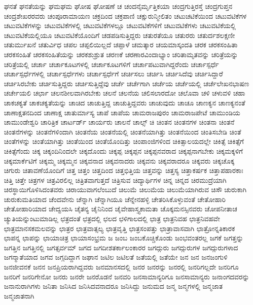 {ಘನತೆ
ಘನತೆಯನ್ನು
ಘಮಘಮ
ಘೋಷ
ಘೋಷಣೆ
ಚ
ಚಂದನೈರ್ಮೃತ್ತಿಕಯಾ
ಚಂದ್ರಗುತ್ತಿರಸ್ತೆ
ಚಂದ್ರಗುಪ್ತನ
ಚಂದ್ರಶೇಖರರವರು
ಚಂಪೂರಾಮಾಯಣ
ಚಕ್ರದಿಂದ
ಚಕ್ರಪಾಣಿ
ಚಕ್ಷುರುನ್ಮೀಲಿತಂ
ಚಟುಚಟಿಕೆಯಿಂದ
ಚಟುವಟಿಕೆಗಳ
ಚಟುವಟಿಕೆಗಳನ್ನು
ಚಟುವಟಿಕೆಗಳಲ್ಲಿ
ಚಟುವಟಿಕೆಗಳಲ್ಲೂ
ಚಟುವಟಿಕೆಗಳಿಗೆ
ಚಟುವಟಿಕೆಗಳು
ಚಟುವಟಿಕೆಯಲ್ಲಿ
ಚಟುವಟಿಕೆಯಲ್ಲಿಯೂ
ಚಟುವಟಿಕೆಯೊಂದಿಗೆ
ಚಡಪಡಿಸುತ್ತಿದ್ದರು
ಚತುರತೆಯೂ
ಚತುರರು
ಚತುರ್ದಶಲಕ್ಷಣೀ
ಚತುರ್ಮುಖನೆ
ಚತುರ್ವಿಧ
ಚಪಲ
ಚಪ್ಪಲಿಯಿಲ್ಲದೆ
ಚಪ್ಪಾಳೆ
ಚಮತ್ಕಾರ
ಚಯಮಾಸ್ಕಂದತಿ
ಚರಕ
ಚರಕಸಂಹಿತಾ
ಚರಕಸಂಹಿತೆ
ಚರಕಸಂಹಿತೆಯನ್ನು
ಚರಕಶುಶ್ರುತ
ಚರಣಕೆ
ಚರಣಾರವಿಂದಾಭ್ಯಾಂ
ಚರಿತಾಮೃತವನ್ನು
ಚರಿತ್ರೆಯನ್ನು
ಚರಿತ್ರೆಯಲ್ಲಿ
ಚರ್ಚಾ
ಚರ್ಚಾಕೂಟಗಳಲ್ಲಿ
ಚರ್ಚಾಕೂಟಗಳಿಗೆ
ಚರ್ಚಾಪಟುವಾಗಿದ್ದರೆಂದು
ಚರ್ಚಾಸ್ಪರ್ಧೆ
ಚರ್ಚಾಸ್ಪರ್ಧೆಗಳಲ್ಲಿ
ಚರ್ಚಾಸ್ಪರ್ಧೆಗಳು
ಚರ್ಚಾಸ್ಪರ್ಧೆಗೆ
ಚರ್ಚಿಸಲು
ಚರ್ಚಿಸಿ
ಚರ್ಚಿಸಿದೆವು
ಚರ್ಚಿಸಿದ್ದಾರೆ
ಚರ್ಚಿಸಿರಬೇಕು
ಚರ್ಚಿಸುತ್ತಿದ್ದರು
ಚರ್ಚಿಸುತ್ತಿದ್ದೆವು
ಚರ್ಚೆ
ಚರ್ಚೆಗಾಗಿ
ಚರ್ಚೆಯ
ಚರ್ಚೆಯಲ್ಲಿ
ಚರ್ಚೆಲೇಖನಭಾಷಣ
ಚರ್ಚೇಯಲಿ
ಚರ್ಛಾ
ಚಲನಶೀಲವಾಗಿರಬೇಕು
ಚಲನೆ
ಚಲನೆಯ
ಚಲಿಸಲಾರದೋ
ಚಲೊವಾ
ಚಳಿ
ಚಳುವಳಿ
ಚಹಾ
ಚಾಕಚಕ್ಯತೆ
ಚಾಕಚಕ್ಯತೆಯನ್ನು
ಚಾಚಿದ
ಚಾಚುತ್ತಿದ್ದ
ಚಾಚುತ್ತಿದ್ದವರು
ಚಾಚುವುದು
ಚಾಚೂ
ಚಾಣಕ್ಯನ
ಚಾಣಕ್ಯನಂತೆ
ಚಾಣಾಕ್ಷತನದಿಂದ
ಚಾಣಾಕ್ಷ
ಚಾತುರ್ಮಾಸ್ಯ
ಚಾಪೆ
ಚಾಪೆಯ
ಚಾಮರಾಜಪುರಂ
ಚಾಮರಾಜಪೇಟೆ
ಚಾಮುಂಡಿಯ
ಚಾಮುಂಡೇಶ್ವರಿ
ಚಾರಿತ್ರಿಕ
ಚಾರ್ಟರ್ಡ್
ಚಾರ್ಯರು
ಚಾಲನೆ
ಚಾಲ್ಸ್
ಚಿ
ಚಿಂತನ
ಚಿಂತನಗಳ
ಚಿಂತನಾ
ಚಿಂತನೆ
ಚಿಂತನೆಗಳನ್ನು
ಚಿಂತನೆಗಳಿಂದಾಗಿ
ಚಿಂತನೆಯ
ಚಿಂತನೆಯಲ್ಲಿ
ಚಿಂತನೆಯಾಗಿತ್ತು
ಚಿಂತನೆಯಿಂದ
ಚಿಂತಿಸಬೇಡಿ
ಚಿಂತೆ
ಚಿಂತೆಗಳನ್ನು
ಚಿಂತೆಯಾಗಿತ್ತು
ಚಿಂತೆಯಿಂದ
ಚಿಂತೆಯೊಂದಿತ್ತು
ಚಿಂಪಾಂಜಿಗಳಿಂದ
ಚಿಕಿತ್ಸಾಲಯದಲ್ಲೇ
ಚಿಕಿತ್ಸೆ
ಚಿಕಿತ್ಸೆಗೆ
ಚಿಕಿತ್ಸೆಗೆಂದು
ಚಿಕ್ಕ
ಚಿಕ್ಕಂದಿನಿಂದಲೇ
ಚಿಕ್ಕದೊಂದು
ಚಿಕ್ಕಪ್ಪ
ಚಿಕ್ಕಪ್ಪನ
ಚಿಕ್ಕಪ್ಪನವರಾದ
ಚಿಕ್ಕಪ್ಪನಾಗಬೇಕು
ಚಿಕ್ಕಮಕ್ಕಳಿಗೆ
ಚಿಕ್ಕಮಾರ್ಕೆಟಿಗೆ
ಚಿಕ್ಕಮ್ಮ
ಚಿಕ್ಕಮ್ಮನ
ಚಿಕ್ಕವನಾದ
ಚಿಕ್ಕವನಾದರು
ಚಿಕ್ಕವನು
ಚಿಕ್ಕವರಾದರೂ
ಚಿಕ್ಕವರು
ಚಿಕ್ಕಚೊಕ್ಕ
ಚಿಗುರು
ಚಿತಾವಣೆಯೊಂದಿಗೆ
ಚಿತ್ತ
ಚಿತ್ತಂ
ಚಿತ್ತದಿಂದ
ಚಿತ್ತಭಿತ್ತಿಯ
ಚಿತ್ತವನ್ನು
ಚಿತ್ತಸ್ಯ
ಚಿತ್ತಾಕರ್ಷಕ
ಚಿತ್ತಾಪಹಾರಕಾಃ
ಚಿತ್ತಿ
ಚಿತ್ತೇ
ಚಿತ್ರಗಳ
ಚಿತ್ರವಿರಲಿಲ್ಲ
ಚಿತ್ರಿತವಾಗುತ್ತದೆ
ಚಿತ್ರಿಸುವ
ಚಿದ್ಯಾರ್ಥಿಗಳ
ಚಿನ್ನ
ಚಿನ್ನದ
ಚಿರಮುದ್ರೆಯಾಗಿ
ಚಿರಸ್ಥಾಯಿಗೊಳಿಸಿದಂತವರು
ಚಿರಾಯುವಾಗಲೆಂಬುದೆ
ಚಿಲುಮೆ
ಚಿಲುಮೆಯ
ಚಿಲುಮೆಯಾಗಿರುವ
ಚಿಸೌ
ಚುರುಕಾಗಿ
ಚುರುಕುಮತಿಯಾದ
ಚೆಂದವೇನು
ಚೆನ್ನಾಗಿ
ಚೆನ್ನಾಗಿಯೂ
ಚೆನ್ನೇನಹಳ್ಳಿ
ಚೇತರಿಸಿಕೊಳ್ಳುವಂತೆ
ಚೇತೋಹಾರಿ
ಚೇತೋಹಾರಿಯಾದ
ಚೇದ್ವಯಸಿ
ಚೈತನ್ಯ
ಚೈನಿನಿಂದ
ಚೈವೇಹಾಸ್ತ್ಯಕಾಮತಾ
ಚೊಕ್ಕಮನಸ್ಸಿನವರು
ಚೋಪನೀತಾಚ
ಚ್ಯುತಿಯನ್ನುಂಟುಮಾಡಿಲ್ಲ
ಛತ್ರದಂತೆ
ಛತ್ರದಲ್ಲಿ
ಛಲದ
ಛಳಿಗಾಲದಲ್ಲಿ
ಛಾತ್ರ
ಛಾತ್ರನಿವಹ
ಛಾತ್ರನಿವಹವೇ
ಛಾತ್ರಮಾನಸಕಮಲವನ್ನು
ಛಾತ್ರರ
ಛಾತ್ರವಾತ್ಸಲ್ಯ
ಛಾತ್ರವೃತ್ತಿ
ಛಾತ್ರಸಂಪತ್ತು
ಛಾತ್ರಾವಾಸವಾಗಿ
ಛಾತ್ರೋನ್ನತಿಕಾರಕ
ಛಾಪನ್ನ
ಛಾಪನ್ನು
ಛಾಯಾಚಿತ್ರ
ಛಾಯಾಸಂಭ್ರಮ
ಜ
ಜಂಬ
ಜಂಬಕೊಚ್ಚಿಕೊಂಡು
ಜಂಭವಂತರಲ್ಲ
ಜಗಕೆ
ಜಗತ್ತನ್ನು
ಜಗತ್ತಿನ
ಜಗತ್ತಿನಲ್ಲಿ
ಜಗತ್ಸರ್ವಮ್
ಜಗದ
ಜಗದೀಶತರ್ಕಾಲಂಕಾರರ
ಜಗದ್ಗುರು
ಜಗದ್ಗುರುಗಳ
ಜಗದ್ಗುರುಗಳಾದ
ಜಗನ್ಮಾತೆಯಾದ
ಜಗವ
ಜಗ್ಗದಿದ್ದಾಗ
ಜಘಾನ
ಜಟಿಲ
ಜಟಿಲತೆ
ಜತೆಯಲ್ಲಿ
ಜತೆಯೇ
ಜನ
ಜನ
ಜನಜಂಗುಳಿ
ಜನಜೀವನಕೆ
ಜನನ
ಜನಪ್ರಿಯರಾಗಿದ್ದವರು
ಜನಮಾನಸದಲ್ಲಿ
ಜನರ
ಜನರನ್ನು
ಜನರಲ್ಲಿ
ಜನರಿಗಲ್ಲದೇ
ಜನರಿಗೂ
ಜನರಿಗೆ
ಜನರಿಗೇನೋ
ಜನರು
ಜನರೇ
ಜನರೊಡನೆ
ಜನವರಿ
ಜನಸಾಮಾನ್ಯರಿಗೂ
ಜನಸಾಮಾನ್ಯರು
ಜನಾಂಗದವರನ್ನು
ಜನಾನುರಾಗಿಗಳು
ಜನಿತಾ
ಜನಿಸಿದ
ಜನಿಸಿದವನಾದರೂ
ಜನಿಸಿದ್ದು
ಜನುಮದ
ಜನ್ಮ
ಜನ್ಮಗಳಲ್ಲಿ
ಜನ್ಮಜಾತ
ಜನ್ಮಜಾತನಾಗಿ
}
